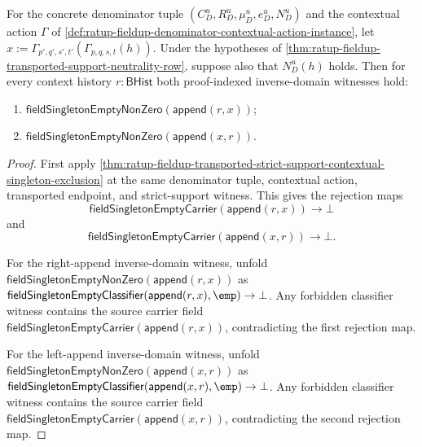 \begin{theorem}
\label{thm:ratup-fieldup-transported-strict-support-contextual-nonzero-package}
For the concrete denominator tuple $(C_D^u,R_D^u,\mu_D^u,e_D^u,N_D^u)$ and the
contextual action $\Gamma$ of
\autoref{def:ratup-fieldup-denominator-contextual-action-instance}, let
$x:=\Gamma_{p',q',s',t'}(\Gamma_{p,q,s,t}(h))$. Under the hypotheses of
\autoref{thm:ratup-fieldup-transported-support-neutrality-row}, suppose also
that $N_D^u(h)$ holds. Then for every context history $r:\mathsf{BHist}$ both
proof-indexed inverse-domain witnesses hold:
\begin{enumerate}
  \item $\mathsf{fieldSingletonEmptyNonZero}(\mathsf{append}(r,x))$;
  \item $\mathsf{fieldSingletonEmptyNonZero}(\mathsf{append}(x,r))$.
\end{enumerate}
\end{theorem}
\begin{proof}
First apply
\autoref{thm:ratup-fieldup-transported-strict-support-contextual-singleton-exclusion}
at the same denominator tuple, contextual action, transported endpoint, and
strict-support witness. This gives the rejection maps
$$
\mathsf{fieldSingletonEmptyCarrier}(\mathsf{append}(r,x))\to\bot
$$
and
$$
\mathsf{fieldSingletonEmptyCarrier}(\mathsf{append}(x,r))\to\bot.
$$

For the right-append inverse-domain witness, unfold
$\mathsf{fieldSingletonEmptyNonZero}(\mathsf{append}(r,x))$ as
$\mathsf{fieldSingletonEmptyClassifier}(\mathsf{append}(r,x),\emp)\to\bot$.
Any forbidden classifier witness contains the source carrier field
$\mathsf{fieldSingletonEmptyCarrier}(\mathsf{append}(r,x))$, contradicting the
first rejection map.

For the left-append inverse-domain witness, unfold
$\mathsf{fieldSingletonEmptyNonZero}(\mathsf{append}(x,r))$ as
$\mathsf{fieldSingletonEmptyClassifier}(\mathsf{append}(x,r),\emp)\to\bot$.
Any forbidden classifier witness contains the source carrier field
$\mathsf{fieldSingletonEmptyCarrier}(\mathsf{append}(x,r))$, contradicting the
second rejection map.
\end{proof}

